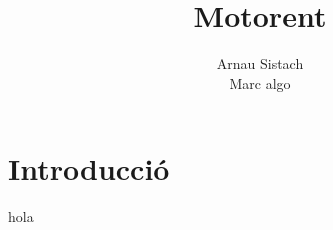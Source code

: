 \documentclass{article}
\title{Motorent}
\author{Arnau Sistach\\Marc algo}
\begin{document}
\maketitle
\tableofcontents

\section{Introducci\'o}
hola
\end{document}
